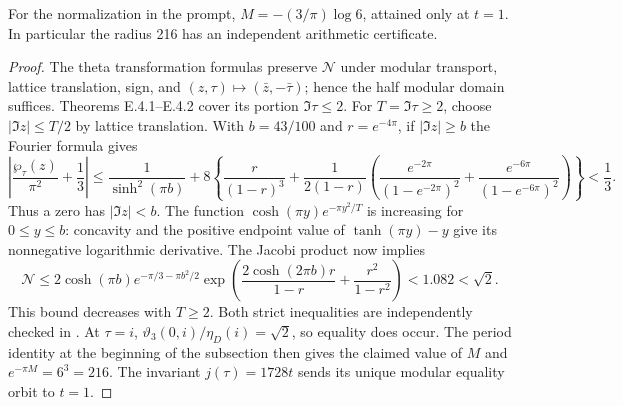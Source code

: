 \begin{corollary}
For the normalization in the prompt, $M=-(3/\pi)\log6$, attained
only at $t=1$. In particular the radius 216 has an independent
arithmetic certificate.
\end{corollary}
\begin{proof}
The theta transformation formulas preserve $\mathcal N$ under modular
transport, lattice translation, sign, and
$(z,\tau)\mapsto(\bar z,-\bar\tau)$; hence the half modular domain
suffices. Theorems E.4.1--E.4.2 cover its portion $\Im\tau\leq2$.
For $T=\Im\tau\geq2$, choose $|\Im z|\leq T/2$ by lattice
translation. With $b=43/100$ and $r=e^{-4\pi}$, if
$|\Im z|\geq b$ the Fourier formula gives
\[
 \left|\frac{\wp_\tau(z)}{\pi^2}+\frac13\right|
 \leq\frac1{\sinh^2(\pi b)}+
 8\left\{\frac r{(1-r)^3}
 +\frac1{2(1-r)}\left(
 \frac{e^{-2\pi}}{(1-e^{-2\pi})^2}+
 \frac{e^{-6\pi}}{(1-e^{-6\pi})^2}\right)\right\}<\frac13.
\]
Thus a zero has $|\Im z|<b$. The function
$\cosh(\pi y)e^{-\pi y^2/T}$ is increasing for $0\leq y\leq b$:
concavity and the positive endpoint value of $\tanh(\pi y)-y$
give its nonnegative logarithmic derivative. The Jacobi product now
implies
\[
 \mathcal N\leq2\cosh(\pi b)
 e^{-\pi/3-\pi b^2/2}
 \exp\left(\frac{2\cosh(2\pi b)r}{1-r}
                +\frac{r^2}{1-r^2}\right)<1.082<\sqrt2.
\]
This bound decreases with $T\geq2$. Both strict inequalities are
independently checked in .
At $\tau=i$, $\vartheta_3(0,i)/\eta_D(i)=\sqrt2$, so equality
does occur. The period identity at the beginning of the subsection
then gives the claimed value of $M$ and
$e^{-\pi M}=6^3=216$. The invariant $j(\tau)=1728t$ sends its
unique modular equality orbit to $t=1$.
\end{proof}
